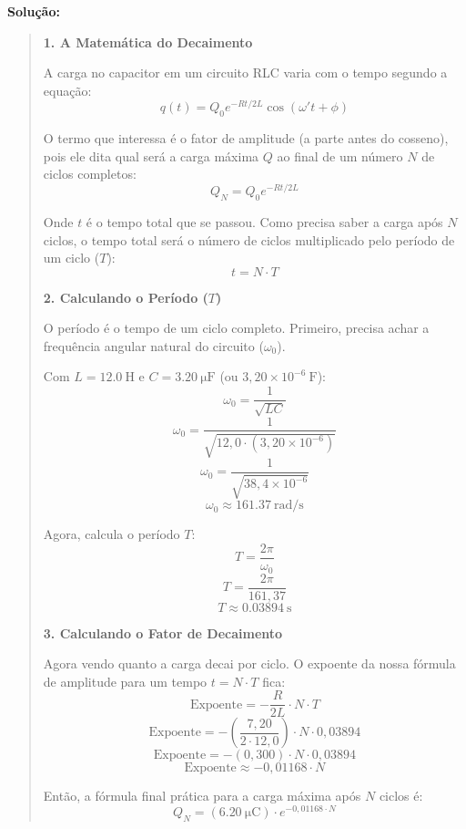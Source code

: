 \documentclass[12pt,a4paper]{article}
\begin{document}
\textbf{Solução:}
\begin{quote}
\noindent \textbf{1. A Matemática do Decaimento}

\vspace{0.2cm}
\noindent A carga no capacitor em um circuito RLC varia com o tempo segundo a equação:
\[
q(t) = Q_0 e^{-Rt / 2L} \cos(\omega' t + \phi)
\]

\noindent O termo que interessa é o fator de amplitude (a parte antes do cosseno), pois ele dita qual será a carga máxima $Q$ ao final de um número $N$ de ciclos completos:
\[
Q_N = Q_0 e^{-Rt / 2L}
\]

\noindent Onde $t$ é o tempo total que se passou. Como precisa saber a carga após $N$ ciclos, o tempo total será o número de ciclos multiplicado pelo período de um ciclo ($T$):
\[
t = N \cdot T
\]

\vspace{0.4cm}
\noindent \textbf{2. Calculando o Período ($T$)}

\vspace{0.2cm}
\noindent O período é o tempo de um ciclo completo. Primeiro, precisa achar a frequência angular natural do circuito ($\omega_0$). 

\noindent Com $L = \SI{12,0}{\henry}$ e $C = \SI{3,20}{\micro\farad}$ (ou $3,20 \times 10^{-6}\ \text{F}$):
\[
\omega_0 = \frac{1}{\sqrt{LC}}
\]
\[
\omega_0 = \frac{1}{\sqrt{12,0 \cdot (3,20 \times 10^{-6})}}
\]
\[
\omega_0 = \frac{1}{\sqrt{38,4 \times 10^{-6}}}
\]
\[
\omega_0 \approx \SI{161,37}{\radian\per\second}
\]


\noindent Agora, calcula o período $T$:
\[
T = \frac{2\pi}{\omega_0}
\]
\[
T = \frac{2\pi}{161,37}
\]
\[
T \approx \SI{0,03894}{\second}
\]

\vspace{0.4cm}
\noindent \textbf{3. Calculando o Fator de Decaimento}

\vspace{0.2cm}
\noindent Agora vendo quanto a carga decai por ciclo. O expoente da nossa fórmula de amplitude para um tempo $t = N \cdot T$ fica:
\[
\text{Expoente} = -\frac{R}{2L} \cdot N \cdot T
\]
\[
\text{Expoente} = -\left(\frac{7,20}{2 \cdot 12,0}\right) \cdot N \cdot 0,03894
\]
\[
\text{Expoente} = -(0,300) \cdot N \cdot 0,03894
\]
\[
\text{Expoente} \approx -0,01168 \cdot N
\]

\noindent Então, a fórmula final prática para a carga máxima após $N$ ciclos é:
\[
Q_N = (\SI{6,20}{\micro\coulomb}) \cdot e^{-0,01168 \cdot N}
\]


\end{quote}
\end{document}
